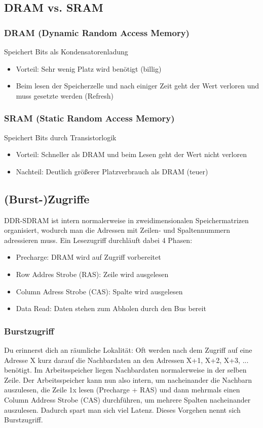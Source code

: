		\subsection{DRAM vs. SRAM}
			\subsubsection{DRAM (Dynamic Random Access Memory)}
				Speichert Bits als Kondensatorenladung \newline
					\begin{itemize}
						\item Vorteil: Sehr wenig Platz wird benötigt (billig)
						\item Beim lesen der Speicherzelle und nach einiger Zeit geht der Wert verloren und muss gesetzte werden (Refresh)
					\end{itemize}
			\subsubsection{SRAM (Static Random Access Memory)}
				Speichert Bits durch Transistorlogik \newline
					\begin{itemize}
						\item Vorteil: Schneller als DRAM und beim Lesen geht der Wert nicht verloren
						\item Nachteil: Deutlich größerer Platzverbrauch als DRAM (teuer)
					\end{itemize}
	\subsection{(Burst-)Zugriffe}
		DDR-SDRAM ist intern normalerweise in zweidimensionalen Speichermatrizen organisiert, wodurch man die Adressen mit Zeilen- und Spaltennummern adressieren muss. \newline \newline
		Ein Lesezugriff durchläuft dabei 4 Phasen: \newline
		\begin{itemize}
		  \item Precharge: DRAM wird auf Zugriff vorbereitet 
		  \item Row Addres Strobe (RAS): Zeile wird ausgelesen
		  \item Column Adress Strobe (CAS): Spalte wird ausgelesen
		  \item Data Read: Daten stehen zum Abholen durch den Bus bereit
		\end{itemize}
		\subsubsection{Burstzugriff}
			Du erinnerst dich an räumliche Lokalität: Oft werden nach dem Zugriff auf eine Adresse X kurz darauf die Nachbardaten an den Adressen X+1, X+2, X+3, ... benötigt. Im Arbeitsspeicher liegen Nachbardaten normalerweise in der selben Zeile. Der Arbeitsspeicher kann nun also intern, um nacheinander die Nachbarn auszulesen, die Zeile 1x lesen (Precharge + RAS) und dann mehrmals einen Column Address Strobe (CAS) durchführen, um mehrere Spalten nacheinander auszulesen. Dadurch spart man sich viel Latenz. Dieses Vorgehen nennt sich Burstzugriff.

				

